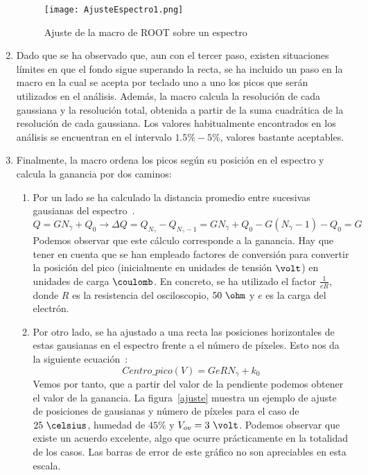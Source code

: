 \begin{enumerate}
\begin{figure}[hbtp]
\centering
\texttt{[image: AjusteEspectro1.png]}
\caption{ Ajuste de la macro de ROOT sobre un espectro\label{Root}}
\end{figure}

\item {} Dado que se ha observado que, aun con el tercer paso, existen situaciones límites en que el fondo sigue superando la recta, se ha incluido un paso en la macro en la cual se acepta por teclado uno a uno los picos que serán utilizados en el análisis. Además, la macro calcula la resolución de cada gaussiana y la resolución total, obtenida a partir de la suma cuadrática de la resolución de cada gaussiana. Los valores habitualmente encontrados en los análisis se encuentran en el intervalo $1.5\% - 5\%$, valores bastante aceptables.

\item {} Finalmente, la macro ordena los picos según su posición en el espectro y calcula la ganancia por dos caminos:
	\begin{enumerate}

	\item {} Por un lado se ha calculado la distancia promedio entre sucesivas gausianas del espectro~\cite{Hueso}.
	\begin{equation} 
	Q = G N_\gamma + Q_0 \longrightarrow \Delta Q= Q_{N_\gamma} - Q_{N_\gamma -1}=G N_\gamma+ Q_0 - G(N_		\gamma -1) - Q_0 = G
	\label{gananciametodo1}
	\end{equation}
	Podemos observar que este cálculo corresponde a la ganancia. Hay que tener en cuenta que se han empleado factores de conversión para convertir la posición del pico (inicialmente en unidades de	tensión $\volt$) en unidades de carga $\coulomb$. En concreto, se ha utilizado el factor $\frac{1}{eR}$, donde $R$ es la resistencia del osciloscopio, $50~\ohm$ y $e$ es la carga del electrón.
	
	\item {} Por otro lado, se ha ajustado a una recta las posiciones horizontales de estas gausianas en el 	espectro frente a el número de píxeles. Esto nos da la siguiente ecuación~\cite{Hueso}:
	\begin{equation}
	Centro\_pico(V) = GeRN_\gamma + k_0
	\label{gananciametodo2}
	\end{equation}
	 Vemos por tanto, que a partir del valor de la pendiente podemos obtener	el valor de la ganancia. La figura~\ref{ajuste} muestra un ejemplo de ajuste de posiciones de gausianas y número de píxeles para el caso de $25~\celsius$, humedad de $45\%$ y $V_{ov}=3~\volt$. Podemos observar que existe	un acuerdo excelente, algo que ocurre prácticamente en la totalidad de los casos. Las barras de error  de este gráfico  no son apreciables en esta  escala.
		

\end{enumerate}
\end{enumerate}
